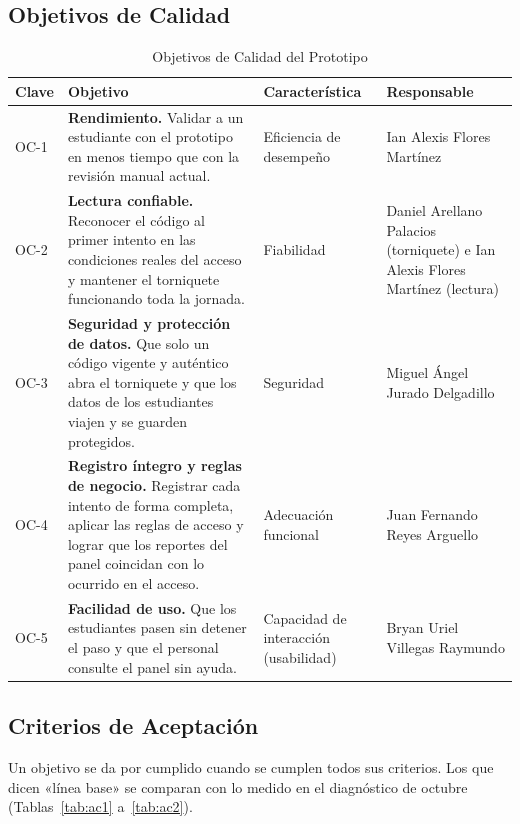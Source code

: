 \subsection{Objetivos de Calidad}
\begin{table}[tbp]
	\caption{Objetivos de Calidad del Prototipo}
	\label{tab:oc}
	\small\setlength{\tabcolsep}{3pt}
	\begin{tabular}{P{1.1cm}P{7.7cm}P{2.8cm}P{3.3cm}}
		\toprule
		Clave & Objetivo & Característica & Responsable \\
		\midrule
		OC-1 & \textbf{Rendimiento.} Validar a un estudiante con el prototipo en menos tiempo que con la revisión manual actual. & Eficiencia de desempeño & Ian Alexis Flores Martínez \\
		OC-2 & \textbf{Lectura confiable.} Reconocer el código al primer intento en las condiciones reales del acceso y mantener el torniquete funcionando toda la jornada. & Fiabilidad & Daniel Arellano Palacios (torniquete) e Ian Alexis Flores Martínez (lectura) \\
		OC-3 & \textbf{Seguridad y protección de datos.} Que solo un código vigente y auténtico abra el torniquete y que los datos de los estudiantes viajen y se guarden protegidos. & Seguridad & Miguel Ángel Jurado Delgadillo \\
		OC-4 & \textbf{Registro íntegro y reglas de negocio.} Registrar cada intento de forma completa, aplicar las reglas de acceso y lograr que los reportes del panel coincidan con lo ocurrido en el acceso. & Adecuación funcional & Juan Fernando Reyes Arguello \\
		OC-5 & \textbf{Facilidad de uso.} Que los estudiantes pasen sin detener el paso y que el personal consulte el panel sin ayuda. & Capacidad de interacción (usabilidad) & Bryan Uriel Villegas Raymundo \\
		\bottomrule
	\end{tabular}
\end{table}

\subsection{Criterios de Aceptación}
Un objetivo se da por cumplido cuando se cumplen todos sus criterios. Los que
dicen «línea base» se comparan con lo medido en el diagnóstico de octubre
(Tablas~\ref{tab:ac1} a~\ref{tab:ac2}).

